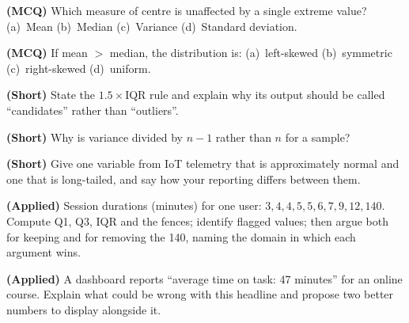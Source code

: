 \begin{reviewq}
  \item \textbf{(MCQ)} Which measure of centre is unaffected by a single extreme
        value? (a)~Mean (b)~Median (c)~Variance (d)~Standard deviation.
  \item \textbf{(MCQ)} If mean $>$ median, the distribution is: (a)~left-skewed
        (b)~symmetric (c)~right-skewed (d)~uniform.
  \item \textbf{(Short)} State the $1.5\times$IQR rule and explain why its output
        should be called ``candidates'' rather than ``outliers''.
  \item \textbf{(Short)} Why is variance divided by $n-1$ rather than $n$ for a
        sample?
  \item \textbf{(Short)} Give one variable from IoT telemetry that is
        approximately normal and one that is long-tailed, and say how your
        reporting differs between them.
  \item \textbf{(Applied)} Session durations (minutes) for one user:
        $3, 4, 4, 5, 5, 6, 7, 9, 12, 140$. Compute Q1, Q3, IQR and the fences;
        identify flagged values; then argue both for keeping and for removing the
        140, naming the domain in which each argument wins.
  \item \textbf{(Applied)} A dashboard reports ``average time on task: 47
        minutes'' for an online course. Explain what could be wrong with this
        headline and propose two better numbers to display alongside it.
\end{reviewq}
